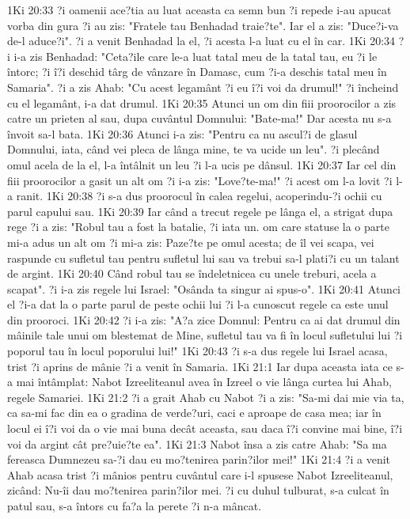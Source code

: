 1Ki 20:33  ?i oamenii ace?tia au luat aceasta ca semn bun ?i repede i-au apucat vorba din gura ?i au zis: "Fratele tau Benhadad traie?te". Iar el a zis: "Duce?i-va de-l aduce?i". ?i a venit Benhadad la el, ?i acesta l-a luat cu el în car.
1Ki 20:34  ?i i-a zis Benhadad: "Ceta?ile care le-a luat tatal meu de la tatal tau, eu ?i le întorc; ?i î?i deschid târg de vânzare în Damasc, cum ?i-a deschis tatal meu în Samaria". ?i a zis Ahab: "Cu acest legamânt ?i eu î?i voi da drumul!" ?i încheind cu el legamânt, i-a dat drumul.
1Ki 20:35  Atunci un om din fiii proorocilor a zis catre un prieten al sau, dupa cuvântul Domnului: "Bate-ma!" Dar acesta nu s-a învoit sa-l bata.
1Ki 20:36  Atunci i-a zis: "Pentru ca nu ascul?i de glasul Domnului, iata, când vei pleca de lânga mine, te va ucide un leu". ?i plecând omul acela de la el, l-a întâlnit un leu ?i l-a ucis pe dânsul.
1Ki 20:37  Iar cel din fiii proorocilor a gasit un alt om ?i i-a zis: "Love?te-ma!" ?i acest om l-a lovit ?i l-a ranit.
1Ki 20:38  ?i s-a dus proorocul în calea regelui, acoperindu-?i ochii cu parul capului sau.
1Ki 20:39  Iar când a trecut regele pe lânga el, a strigat dupa rege ?i a zis: "Robul tau a fost la batalie, ?i iata un. om care statuse la o parte mi-a adus un alt om ?i mi-a zis: Paze?te pe omul acesta; de îl vei scapa, vei raspunde cu sufletul tau pentru sufletul lui sau va trebui sa-l plati?i cu un talant de argint.
1Ki 20:40  Când robul tau se îndeletnicea cu unele treburi, acela a scapat". ?i i-a zis regele lui Israel: "Osânda ta singur ai spus-o".
1Ki 20:41  Atunci el ?i-a dat la o parte parul de peste ochii lui ?i l-a cunoscut regele ca este unul din prooroci.
1Ki 20:42  ?i i-a zis: "A?a zice Domnul: Pentru ca ai dat drumul din mâinile tale unui om blestemat de Mine, sufletul tau va fi în locul sufletului lui ?i poporul tau în locul poporului lui!"
1Ki 20:43  ?i s-a dus regele lui Israel acasa, trist ?i aprins de mânie ?i a venit în Samaria.
1Ki 21:1  Iar dupa aceasta iata ce s-a mai întâmplat: Nabot Izreeliteanul avea în Izreel o vie lânga curtea lui Ahab, regele Samariei.
1Ki 21:2  ?i a grait Ahab cu Nabot ?i a zis: "Sa-mi dai mie via ta, ca sa-mi fac din ea o gradina de verde?uri, caci e aproape de casa mea; iar în locul ei î?i voi da o vie mai buna decât aceasta, sau daca î?i convine mai bine, î?i voi da argint cât pre?uie?te ea".
1Ki 21:3  Nabot însa a zis catre Ahab: "Sa ma fereasca Dumnezeu sa-?i dau eu mo?tenirea parin?ilor mei!"
1Ki 21:4  ?i a venit Ahab acasa trist ?i mânios pentru cuvântul care i-l spusese Nabot Izreeliteanul, zicând: Nu-îi dau mo?tenirea parin?ilor mei. ?i cu duhul tulburat, s-a culcat în patul sau, s-a întors cu fa?a la perete ?i n-a mâncat.
